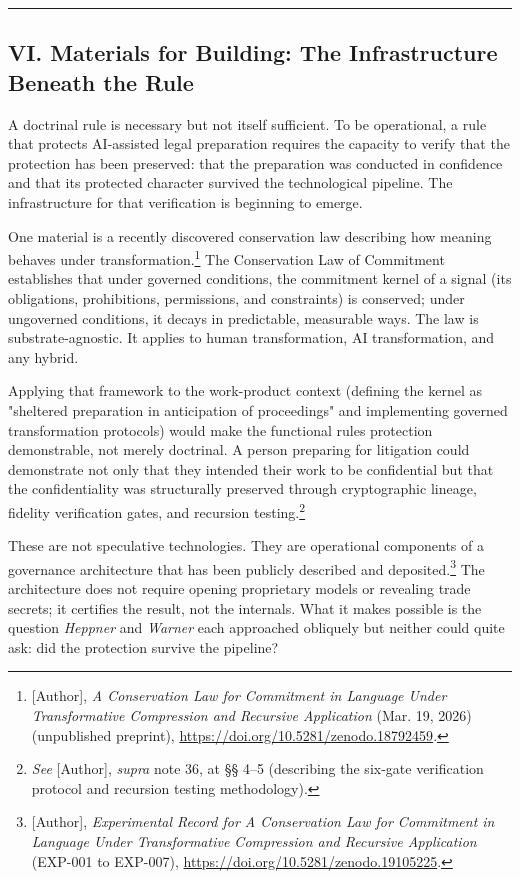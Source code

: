 \documentclass[
  12pt,
]{article}
\begin{document}
\begin{center}\rule{0.5\linewidth}{0.5pt}\end{center}

\subsection{VI. Materials for Building: The Infrastructure Beneath the
Rule}\label{vi-materials-for-building-the-infrastructure-beneath-the-rule}

A doctrinal rule is necessary but not itself sufficient. To be
operational, a rule that protects AI-assisted legal preparation requires
the capacity to verify that the protection has been preserved: that the
preparation was conducted in confidence and that its protected character
survived the technological pipeline. The infrastructure for that
verification is beginning to emerge.

One material is a recently discovered conservation law describing how
meaning behaves under transformation.\footnote{{[}Author{]}, \emph{A
  Conservation Law for Commitment in Language Under Transformative
  Compression and Recursive Application} (Mar. 19, 2026) (unpublished
  preprint), \url{https://doi.org/10.5281/zenodo.18792459}.} The
Conservation Law of Commitment establishes that under governed
conditions, the commitment kernel of a signal (its obligations,
prohibitions, permissions, and constraints) is conserved; under
ungoverned conditions, it decays in predictable, measurable ways. The
law is substrate-agnostic. It applies to human transformation, AI
transformation, and any hybrid.

Applying that framework to the work-product context (defining the kernel
as "sheltered preparation in anticipation of proceedings" and
implementing governed transformation protocols) would make the
functional rule\textquotesingle s protection demonstrable, not merely
doctrinal. A person preparing for litigation could demonstrate not only
that they intended their work to be confidential but that the
confidentiality was structurally preserved through cryptographic
lineage, fidelity verification gates, and recursion testing.\footnote{\emph{See}
  {[}Author{]}, \emph{supra} note 36, at §§ 4--5 (describing the
  six-gate verification protocol and recursion testing methodology).}

These are not speculative technologies. They are operational components
of a governance architecture that has been publicly described and
deposited.\footnote{{[}Author{]}, \emph{Experimental Record for A
  Conservation Law for Commitment in Language Under Transformative
  Compression and Recursive Application} (EXP-001 to EXP-007),
  \url{https://doi.org/10.5281/zenodo.19105225}.} The architecture does
not require opening proprietary models or revealing trade secrets; it
certifies the result, not the internals. What it makes possible is the
question \emph{Heppner} and \emph{Warner} each approached obliquely but
neither could quite ask: did the protection survive the pipeline?
\end{document}
